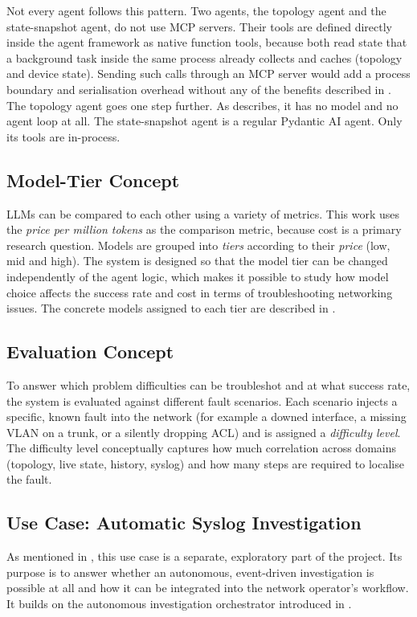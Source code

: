 Not every agent follows this pattern. Two agents, the topology agent and the state-snapshot agent,
do not use MCP servers. Their tools are defined directly inside the agent framework as native
function tools, because both read state that a background task inside the same process already
collects and caches (topology and device state). Sending such calls through an MCP server would
add a process boundary and serialisation overhead without any of the benefits described in
. The topology agent goes one step further. As  describes,
it has no model and no agent loop at all. The state-snapshot agent is a
regular Pydantic AI agent. Only its tools are in-process.

\subsection{Model-Tier Concept}
\label{sec:model-tier-concept}
LLMs can be compared to each other using a variety of metrics. This work uses the \emph{price per million tokens} as the comparison metric, because cost is a primary research question.
Models are grouped into \emph{tiers} according to their \emph{price} (low, mid and high). The system is
designed so that the model tier can be changed independently of the agent logic, which makes it possible to
study how model choice affects the success rate and cost in terms of troubleshooting networking issues.
The concrete models assigned to each tier are described in .

\subsection{Evaluation Concept}
\label{sec:evaluation-concept}
To answer which problem difficulties can be troubleshot and at what success rate, the system is evaluated
against different fault scenarios. Each scenario injects a specific, known fault into
the network (for example a downed interface, a missing VLAN on a trunk, or a silently dropping ACL) and is
assigned a \emph{difficulty level}. The difficulty level conceptually captures how much correlation across
domains (topology, live state, history, syslog) and how many steps are required to localise the
fault.

\subsection{Use Case: Automatic Syslog Investigation}
\label{sec:autonomous-syslog-usecase}
As mentioned in , this use case is a separate, exploratory part of the project. Its
purpose is to answer whether an autonomous, event-driven investigation is possible at all and how it
can be integrated into the network operator's workflow. It
builds on the autonomous investigation orchestrator introduced in . 

